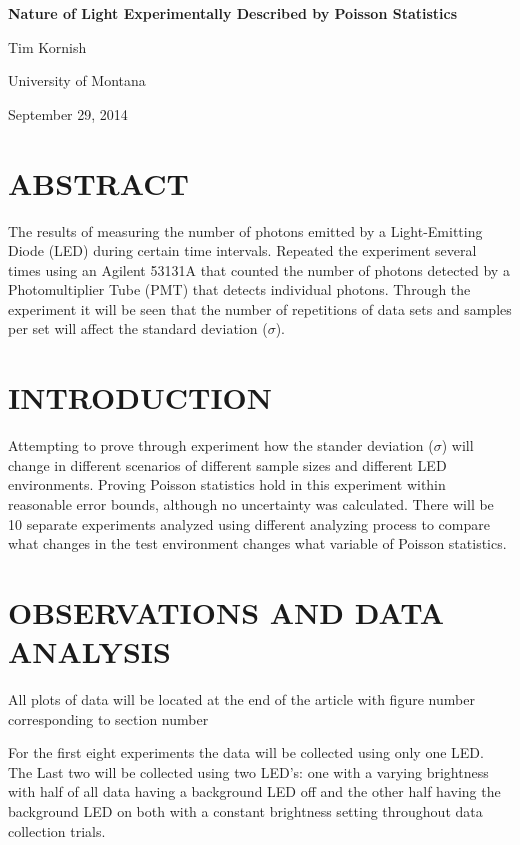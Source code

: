 \documentclass[12 pt,twoside]{article}
\begin{document}
\begin{center}

{\LARGE{\bf Nature of Light Experimentally Described by Poisson Statistics}}

{\large Tim Kornish}

University of Montana

September 29, 2014
\end{center}

\section{ABSTRACT}

The results of measuring the number of  photons emitted by a Light-Emitting Diode (LED) during certain time intervals. Repeated the experiment several times using an Agilent 53131A that counted the number of photons detected by a Photomultiplier Tube (PMT) that detects individual photons. Through the experiment it will be seen that the number of repetitions of data sets and samples per set will affect the standard deviation ($\sigma$). 

\section{INTRODUCTION}
Attempting to prove through experiment how the stander deviation ($\sigma$) will change in different scenarios of different sample sizes and different LED environments. Proving Poisson statistics hold in this experiment within reasonable error bounds, although no uncertainty was calculated. There will be 10 separate experiments analyzed using different analyzing process to compare what changes in the test environment changes what variable of Poisson statistics.                                              
             
\section{OBSERVATIONS AND DATA ANALYSIS}

All plots of data will be located at the end of the article with figure number corresponding to section number

For the first eight experiments the data will be collected using only one LED. The Last two will be collected using two LED's: one with a varying brightness with half of all data having a background LED off and the other half having the background LED on both with a constant brightness setting throughout  data collection trials.
\end{document}
